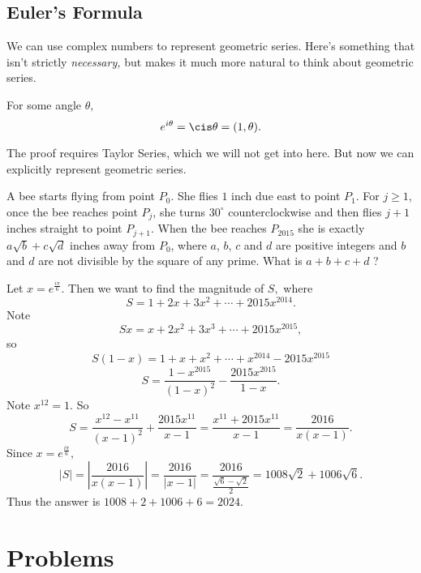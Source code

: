 \documentclass[mast]{lucky}
\begin{document}
\subsection{Euler's Formula}
We can use complex numbers to represent geometric series. Here's something that isn't strictly \textit{necessary,} but makes it much more natural to think about geometric series.

\begin{theo}
For some angle $\theta,$
\[e^{i\theta}=\cis\theta=(1,\theta).\]
\end{theo}

The proof requires Taylor Series, which we will not get into here. But now we can explicitly represent geometric series.

\begin{exam}[AMC 12B 2015/25]
A bee starts flying from point $P_0$. She flies $1$ inch due east to point $P_1$. For $j \ge 1$, once the bee reaches point $P_j$, she turns $30^{\circ}$ counterclockwise and then flies $j+1$ inches straight to point $P_{j+1}$. When the bee reaches $P_{2015}$ she is exactly $a \sqrt{b} + c \sqrt{d}$ inches away from $P_0$, where $a$, $b$, $c$ and $d$ are positive integers and $b$ and $d$ are not divisible by the square of any prime. What is $a+b+c+d$ ?
\end{exam}

\begin{sol}
Let $x=e^{\frac{i\pi}{6}}.$ Then we want to find the magnitude of $S,$ where
\[S=1+2x+3x^2+\cdots+2015x^{2014}.\]
Note
\[Sx=x+2x^2+3x^3+\cdots+2015x^{2015},\]
so
\[S(1-x)=1+x+x^2+\cdots+x^{2014}-2015x^{2015}\]
\[S=\frac{1-x^{2015}}{(1-x)^2}-\frac{2015x^{2015}}{1-x}.\]
Note $x^{12}=1.$ So
\[S=\frac{x^{12}-x^{11}}{(x-1)^2}+\frac{2015x^{11}}{x-1}=\frac{x^{11}+2015x^{11}}{x-1}=\frac{2016}{x(x-1)}.\]
Since $x=e^{\frac{i\pi}{6}},$
\[|S|=|\frac{2016}{x(x-1)}|=\frac{2016}{|x-1|}=\frac{2016}{\frac{\sqrt{6}-\sqrt{2}}{2}}=1008\sqrt{2}+1006\sqrt{6}.\]
Thus the answer is $1008+2+1006+6=2024.$
\end{sol}

\pagebreak\section{Problems}

\minpt{}

\psetquote{}{}
\end{document}
